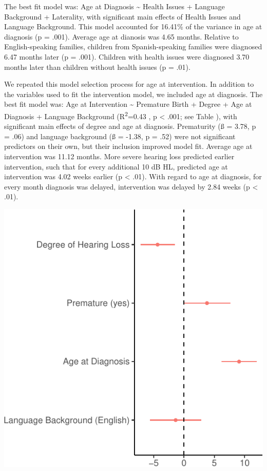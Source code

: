 \documentclass[english,man]{apa6}
\begin{document}
The best fit model was: Age at Diagnosis \textasciitilde{} Health Issues + Language Background + Laterality, with significant main effects of Health Issues and Language Background. This model accounted for 16.41\% of the variance in age at diagnosis (p = .001). Average age at dianosis was 4.65 months. Relative to English-speaking families, children from Spanish-speaking families were diagnosed 6.47 months later (p = .001). Children with health issues were diagnosed 3.70 months later than children without health issues (p = .01).

We repeated this model selection process for age at intervention. In addition to the variables used to fit the intervention model, we included age at diagnosis. The best fit model was: Age at Intervention \textasciitilde{} Premature Birth + Degree + Age at Diagnosis + Language Background (R\textsuperscript{2}=0.43 , p \textless{} .001; see Table ), with significant main effects of degree and age at diagnosis. Prematurity (ß = 3.78, p = .06) and language background (ß = -1.38, p = .52) were not significant predictors on their own, but their inclusion improved model fit. Average age at intervention was 11.12 months. More severe hearing loss predicted earlier intervention, such that for every additional 10 dB HL, predicted age at intervention was 4.02 weeks earlier (p \textless{} .01). With regard to age at diagnosis, for every month diagnosis was delayed, intervention was delayed by 2.84 weeks (p \textless{} .01).

\includegraphics{ELSSP_paper_files/figure-latex/intervention-betas-1.pdf}
\end{document}
